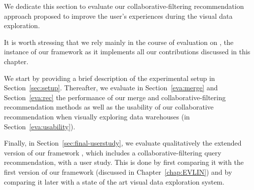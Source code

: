 We dedicate this section to evaluate our collaborative-filtering recommendation approach proposed to improve the user's experiences during the visual data exploration. 

{\color{Fuchsia}It is worth stressing that we rely mainly in the course of evaluation on \prototype{}, the instance of our framework \framework{} as it implements all our contributions discussed in this chapter.}


 
We start by providing a brief description of the experimental setup in Section~\ref{sec:setup}. 
Thereafter, we evaluate in Section~\ref{eva:merge} and Section~\ref{eva:rec} the performance of our merge and collaborative-filtering recommendation methods as well as the usability of our collaborative recommendation when visually exploring data warehouses (in Section~\ref{eva:usability}).

Finally, in Section~\ref{sec:final-userstudy}, we evaluate qualitatively the extended version of our framework \framework{}, which includes a collaborative-filtering query recommendation, with a user study. This is done by first comparing it with the first version of our framework \framework{} (discussed in Chapter~\ref{chap:EVLIN}) and by comparing it later with a state of the art visual data exploration system.






